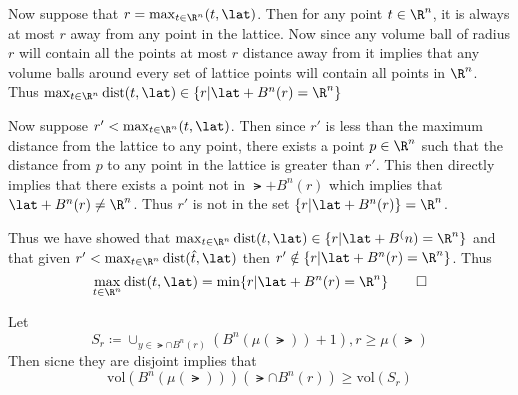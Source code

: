 \documentclass[12pt]{amsart}
\begin{document}
  \begin{problem}
    \begin{subproblem}

  Now suppose that $r= \max_{t\in\R^n}(t,\lat)$. Then for any point $t\in\R^n$, it is always at most $r$ away from any point in the lattice. Now since any volume ball of radius $r$ will contain all the points at most $r$ distance away from it implies that any volume balls around every set of lattice points will contain all points in $\R^n$. Thus $\max_{t\in\R^n}\text{dist}(t,\lat)\in \{r|\lat+B^n(r)=\R^n\}$ 

  Now suppose $r'<\max_{t\in\R^n}(t,\lat)$. Then since $r'$ is less than the maximum distance from the lattice to any point, there exists a point $p\in\R^n$ such that the distance from $p$ to any point in the lattice is greater than $r'$. This then directly implies that there exists a point not in $\lat+B^n(r)$ which implies that $\lat+B^n(r)\neq\R^n$. Thus $r'$ is not in the set $\{r|\lat+B^n(r)\}=\R^n$.

  Thus we have showed that $\max_{t\in\R^n}\text{dist}(t,\lat)\in \{r|\lat+B^(n)=\R^n\}$ and that given $r'<\max_{t\in\R^n}\text{dist}(\hat t, \lat)$ then $r'\notin \{r|\lat+B^n(r)=\R^n\}$. Thus 
  \[\max_{t\in\R^n}\text{dist}(t,\lat)= \min\{r|\lat+B^n(r)=\R^n\}\qed\]
    \end{subproblem}
    \begin{subproblem}
      Let 
      \[S_r \coloneq \cup_{y\in \lat \cap B^n(r)}(B^n(\mu(\lat))+1), r \geq \mu(\lat)\]
      Then sicne they are disjoint implies that 
      \[\text{vol}(B^n(\mu(\lat)))(\lat \cap B^n(r))\geq \text{vol}(S_r)\]
      

\end{subproblem}
\end{problem}
\end{document}
